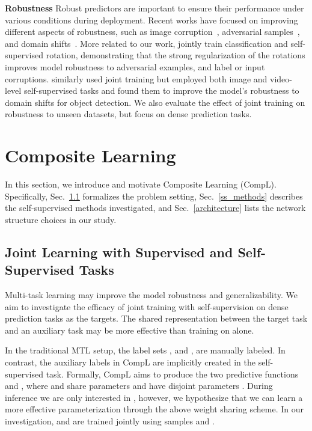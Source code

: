 \documentclass[10pt,twocolumn,letterpaper]{article}
\newcommand{\parsection}[1]{\vspace{1mm}\noindent\textbf{#1 }}
\begin{document}
\parsection{Robustness}
Robust predictors are important to ensure their performance under various conditions during deployment.
Recent works have focused on improving different aspects of robustness, such as image corruption~\cite{hendrycks2019benchmarking}, adversarial samples~\cite{zhang2019theoretically}, and domain shifts~\cite{yu2020bdd100k}.
More related to our work, \cite{hendrycks2019using} jointly train classification and self-supervised rotation, demonstrating that the strong regularization of the rotations improves model robustness to adversarial examples, and label or input corruptions. 
\cite{wang2021robust} similarly used joint training but employed both image and video-level self-supervised tasks and found them to improve the model's robustness to domain shifts for object detection.
We also evaluate the effect of joint training on robustness to unseen datasets, but focus on dense prediction tasks.
 \section{Composite Learning}

In this section, we introduce and motivate Composite Learning (CompL). 
Specifically, Sec.~\ref{method} formalizes the problem setting, Sec.~\ref{ss_methods} describes the self-supervised methods investigated, and Sec.~\ref{architecture} lists the network structure choices in our study.

\subsection{Joint Learning with Supervised and Self-Supervised Tasks}
\label{method}

Multi-task learning may improve the model robustness and generalizability. We aim to investigate the efficacy of joint training with self-supervision on dense prediction tasks as the targets.
The shared representation between the target task  and an auxiliary task  may be more effective than training on  alone.

In the traditional MTL setup, the label sets , and , are manually labeled. 
In contrast, the auxiliary labels  in CompL are implicitly created in the self-supervised task.
Formally, CompL aims to produce the two predictive functions  and , where  and  share parameters  and have disjoint parameters .
During inference we are only interested in , however, we hypothesize that we can learn a more effective parameterization through the above weight sharing scheme. 
In our investigation,  and  are trained jointly using samples  and .
\end{document}
